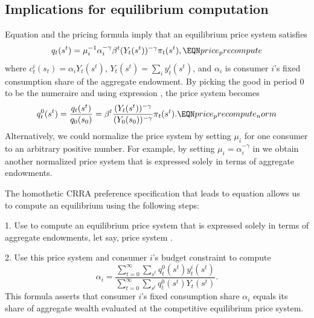 \subsection{Implications for equilibrium computation}\label{sec:compeasy}%
\noindent Equation  and the pricing formula
 imply that an equilibrium price system satisfies
$$ q_t(s^t) = \mu_i^{-1} \alpha_i^{-\gamma} \beta^t (Y_t(s^t))^{-\gamma} \pi_t(s^t) , \EQN price_precompute$$
where $c_t^i(s_t) = \alpha_i Y_t(s^t)$, $Y_t(s^t) = \sum_i y_t^i(s^t)$, and $\alpha_i$ is consumer $i$'s
fixed consumption share of the aggregate endowment.
By picking the good in period $0$ to be the numeraire and 
using expression , the price
system becomes
$$ q^0_t(s^t) = {\frac {q_t(s^t)} {q_0(s_0)} } 
= \beta^t {\frac {(Y_t(s^t))^{-\gamma}} {(Y_0(s_0))^{-\gamma}} }
 \pi_t(s^t) .   \EQN price_precompute_norm$$  
Alternatively, we could normalize the price system by setting 
$\mu_i$ for one consumer to an arbitrary positive number.
For example, by setting 
$\mu_i = \alpha_i^{-\gamma}$ in 
we obtain another normalized 
price system that is expressed solely in terms of
aggregate endowments.

The homothetic CRRA preference specification that leads to equation  allows us to compute an equilibrium
using the following steps:
\medskip
\item{1.} Use  to compute an equilibrium price system that is expressed solely in terms of aggregate 
endowments, let say, price system .

\medskip
\item{2.} Use this price system and consumer $i$'s budget 
constraint to compute
$$ \alpha_i = {\frac {\sum_{t=0}^\infty \sum_{s^t} q^0_t(s^t) y_t^i(s^t) } {\sum_{t=0}^\infty \sum_{s^t} q^0_t(s^t)  Y_t(s^t)  } } .$$
This formula asserts that consumer $i$'s fixed consumption share $\alpha_i$ equals its share of aggregate wealth evaluated at the competitive  equilibrium price system.



